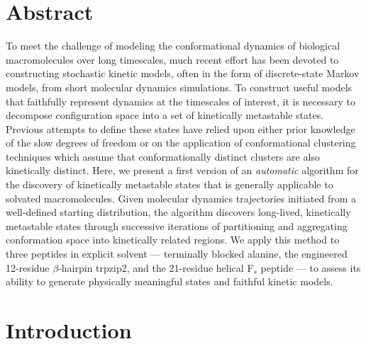 \section*{Abstract}

To meet the challenge of modeling the conformational dynamics of biological macromolecules over long timescales, much recent effort has been devoted to constructing stochastic kinetic models, often in the form of discrete-state Markov models, from short molecular dynamics simulations.
To construct useful models that faithfully represent dynamics at the timescales of interest, it is necessary to decompose configuration space into a set of kinetically metastable states.
Previous attempts to define these states have relied upon either prior knowledge of the slow degrees of freedom or on the application of conformational clustering techniques which assume that conformationally distinct clusters are also kinetically distinct.
Here, we present a first version of an \emph{automatic} algorithm for the discovery of kinetically metastable states that is generally applicable to solvated macromolecules.
Given molecular dynamics trajectories initiated from a well-defined starting distribution, the algorithm discovers long-lived, kinetically metastable states through successive iterations of partitioning and aggregating conformation space into kinetically related regions.
We apply this method to three peptides in explicit solvent --- terminally blocked alanine, the engineered 12-residue $\beta$-hairpin trpzip2, and the 21-residue helical F$_s$ peptide --- to assess its ability to generate physically meaningful states and faithful kinetic models.


\section{Introduction}



